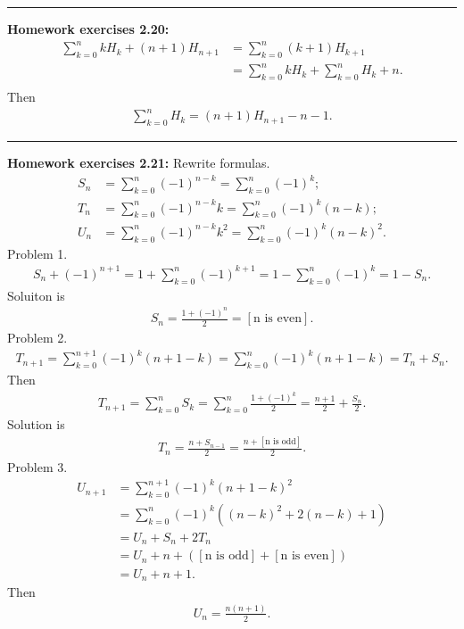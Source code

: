 \documentclass{article}
\begin{document}
\noindent\rule{\textwidth}{0.4pt}
\textbf{Homework exercises 2.20:}
\begin{align}
\sum_{k=0}^n kH_k + (n+1)H_{n+1} &= \sum_{k=0}^n (k+1)H_{k+1} \\
				 &= \sum_{k=0}^n kH_k + \sum_{k=0}^n H_k + n.\\
\end{align}
Then 
\begin{align}
\sum_{k=0}^n H_k = (n+1)H_{n+1} - n - 1.
\end{align}

\noindent\rule{\textwidth}{0.4pt}
\textbf{Homework exercises 2.21:}
Rewrite formulas.
\begin{align}
S_n &= \sum_{k=0}^n (-1)^{n-k} = \sum_{k=0}^n (-1)^k; \\
T_n &= \sum_{k=0}^n (-1)^{n-k}k = \sum_{k=0}^n (-1)^{k}(n-k); \\
U_n &= \sum_{k=0}^n (-1)^{n-k}k^2 = \sum_{k=0}^n (-1)^{k}(n-k)^2.
\end{align}
Problem 1.
\begin{align}
S_n + (-1)^{n+1} = 1 + \sum_{k=0}^n (-1)^{k+1} = 1 - \sum_{k=0}^n (-1)^{k} = 1 - S_n.
\end{align}
Soluiton is
\begin{align}
S_n = \frac{1 + (-1)^n}{2} = [\text{n is even}].
\end{align}
Problem 2.
\begin{align}
T_{n+1} = \sum_{k=0}^{n+1}(-1)^k(n+1-k) = \sum_{k=0}^n(-1)^k(n+1-k) = T_n + S_n.
\end{align}
Then
\begin{align}
T_{n+1} = \sum_{k=0}^{n}S_k = \sum_{k=0}^{n}\frac{1+(-1)^k}{2} = \frac{n+1}{2} + \frac{S_n}{2}.
\end{align}
Solution is
\begin{align}
T_n = \frac{n + S_{n-1}}{2} = \frac{n + [\text{n is odd}]}{2}.
\end{align}
Problem 3.
\begin{align}
U_{n+1} &= \sum_{k=0}^{n+1}(-1)^k(n+1-k)^2 \\
	&= \sum_{k=0}^n(-1)^k((n-k)^2 + 2(n-k) + 1) \\
	&= U_n + S_n + 2T_n \\
	&= U_n + n + ([\text{n is odd}] + [\text{n is even}])\\
	&= U_n + n + 1.
\end{align}
Then 
\begin{align}
U_n = \frac{n(n+1)}{2}.
\end{align}
\end{document}

